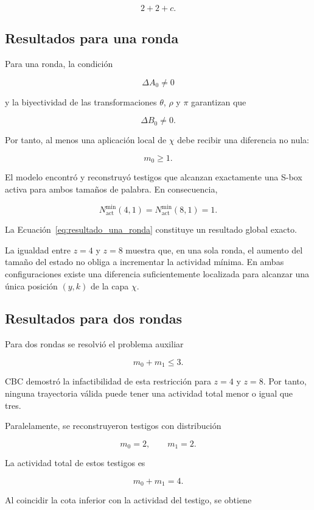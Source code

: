 \[
2+2+c.
\]


\subsection{Resultados para una ronda}
\label{subsec:resultados_una_ronda}

Para una ronda, la condición

\[
\Delta A_0 \neq 0
\]

y la biyectividad de las transformaciones $\theta$, $\rho$ y $\pi$
garantizan que

\[
\Delta B_0 \neq 0.
\]

Por tanto, al menos una aplicación local de $\chi$ debe recibir una
diferencia no nula:

\[
m_0 \geq 1.
\]

El modelo encontró y reconstruyó testigos que alcanzan exactamente una
S-box activa para ambos tamaños de palabra. En consecuencia,

\[
N_{\mathrm{act}}^{\min}(4,1)
=
N_{\mathrm{act}}^{\min}(8,1)
=
1.
\label{eq:resultado_una_ronda}
\]

La Ecuación~\ref{eq:resultado_una_ronda} constituye un resultado global
exacto.

La igualdad entre $z=4$ y $z=8$ muestra que, en una sola ronda, el aumento
del tamaño del estado no obliga a incrementar la actividad mínima. En
ambas configuraciones existe una diferencia suficientemente localizada
para alcanzar una única posición $(y,k)$ de la capa $\chi$.


\subsection{Resultados para dos rondas}
\label{subsec:resultados_dos_rondas}

Para dos rondas se resolvió el problema auxiliar

\[
m_0+m_1 \leq 3.
\]

CBC demostró la infactibilidad de esta restricción para $z=4$ y $z=8$.
Por tanto, ninguna trayectoria válida puede tener una actividad total
menor o igual que tres.

Paralelamente, se reconstruyeron testigos con distribución

\[
m_0=2,
\qquad
m_1=2.
\]

La actividad total de estos testigos es

\[
m_0+m_1=4.
\]

Al coincidir la cota inferior con la actividad del testigo, se obtiene

